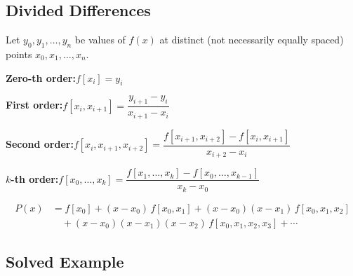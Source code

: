 \documentclass[12pt]{article}
\begin{document}
\subsection*{Divided Differences}

\begin{defbox}
Let $y_0, y_1, \ldots, y_n$ be values of $f(x)$ at distinct (not necessarily equally spaced) points $x_0, x_1, \ldots, x_n$.

\medskip
\textbf{Zero-th order:}\quad $f[x_i] = y_i$

\medskip
\textbf{First order:}\quad $f[x_i, x_{i+1}] = \dfrac{y_{i+1} - y_i}{x_{i+1} - x_i}$

\medskip
\textbf{Second order:}\quad $f[x_i, x_{i+1}, x_{i+2}] = \dfrac{f[x_{i+1},x_{i+2}] - f[x_i,x_{i+1}]}{x_{i+2} - x_i}$

\medskip
\textbf{$k$-th order:}\quad $f[x_0,\ldots,x_k] = \dfrac{f[x_1,\ldots,x_k] - f[x_0,\ldots,x_{k-1}]}{x_k - x_0}$
\end{defbox}

\begin{thmbox}
\begin{align*}
P(x) &= f[x_0]
+ (x-x_0)\,f[x_0,x_1]
+ (x-x_0)(x-x_1)\,f[x_0,x_1,x_2] \\
&\quad + (x-x_0)(x-x_1)(x-x_2)\,f[x_0,x_1,x_2,x_3]
+ \cdots
\end{align*}
\end{thmbox}

\subsection*{Solved Example}
\end{document}
